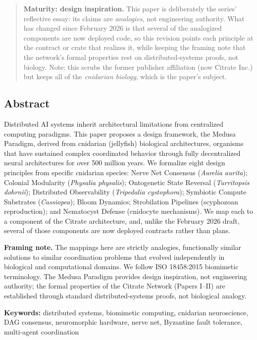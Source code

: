 \begin{quote}
\textbf{Maturity: design inspiration.} This paper is deliberately the
series' reflective essay: its claims are \emph{analogies}, not
engineering authority. What has changed since February 2026 is that
several of the analogized components are now deployed code, so this
revision points each principle at the contract or crate that realizes
it, while keeping the framing note that the network's formal properties
rest on distributed-systems proofs, not biology. Note: this scrubs the
former publisher affiliation (now Citrate Inc.) but keeps all of the
\emph{cnidarian biology}, which is the paper's subject.
\end{quote}

\subsection{Abstract}\label{abstract}

Distributed AI systems inherit architectural limitations from
centralized computing paradigms. This paper proposes a design framework,
the Medusa Paradigm, derived from cnidarian (jellyfish) biological
architectures, organisms that have sustained complex coordinated
behavior through fully decentralized neural architectures for over 500
million years. We formalize eight design principles from specific
cnidarian species: Nerve Net Consensus (\emph{Aurelia aurita}); Colonial
Modularity (\emph{Physalia physalis}); Ontogenetic State Reversal
(\emph{Turritopsis dohrnii}); Distributed Observability
(\emph{Tripedalia cystophora}); Symbiotic Compute Substrates
(\emph{Cassiopea}); Bloom Dynamics; Strobilation Pipelines (scyphozoan
reproduction); and Nematocyst Defense (cnidocyte mechanisms). We map
each to a component of the Citrate architecture, and, unlike the
February 2026 draft, several of those components are now deployed
contracts rather than plans.

\textbf{Framing note.} The mappings here are strictly analogies,
functionally similar solutions to similar coordination problems that
evolved independently in biological and computational domains. We follow
ISO 18458:2015 biomimetic terminology. The Medusa Paradigm provides
design inspiration, not engineering authority; the formal properties of
the Citrate Network (Papers I--II) are established through standard
distributed-systems proofs, not biological analogy.

\textbf{Keywords:} distributed systems, biomimetic computing, cnidarian
neuroscience, DAG consensus, neuromorphic hardware, nerve net, Byzantine
fault tolerance, multi-agent coordination

